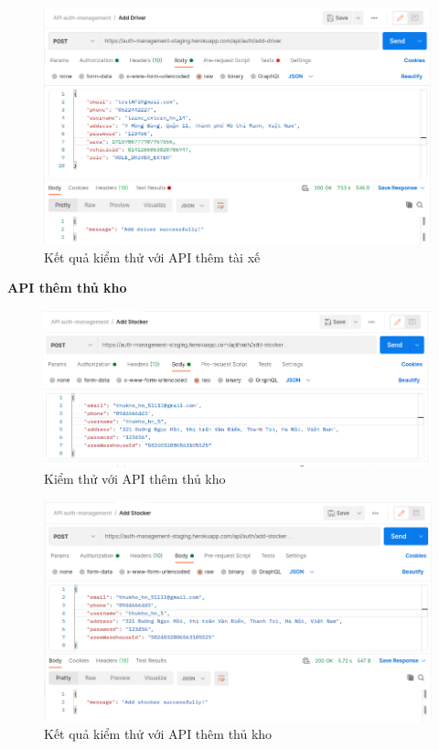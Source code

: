 		\begin{figure}[H]
			\includegraphics[width=1\textwidth]{Images/testing/API-add-driver-result.png}
			\centering
			\linebreak
			\caption{Kết quả kiểm thử với API thêm tài xế}
		\end{figure}

		\newpage
		\textbf{API thêm thủ kho}
		
		\begin{figure}[H]
			\includegraphics[width=1\textwidth]{Images/testing/API-add-stocker.png}
			\centering
			\linebreak
			\caption{Kiểm thử với API thêm thủ kho}
		\end{figure}
		
		\begin{figure}[H]
			\includegraphics[width=1\textwidth]{Images/testing/API-add-stocker-result.png}
			\centering
			\linebreak
			\caption{Kết quả kiểm thử với API thêm thủ kho}
		\end{figure}
		
